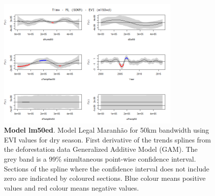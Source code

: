 \begin{table}

\begin{figure}[H]
 \centering
        \centering
        \includegraphics[width=0.8\textwidth]{ml50ed.png} %
        \caption[Model Legal Maranhão for 50km bandwidth using EVI values for dry season. First derivative of the trends splines from the deforestation data Generalized Additive Model (GAM)]{\textbf{Model lm50ed}. Model Legal Maranhão for 50km bandwidth using EVI values for dry season. First derivative of the trends splines from the deforestation data Generalized Additive Model (GAM). The grey band is a 99\% simultaneous point-wise confidence interval. Sections of the spline where the confidence interval does not include zero are indicated by coloured sections. Blue colour means positive values and red colour means negative values.}
        \centering
\end{figure}
\end{table}
